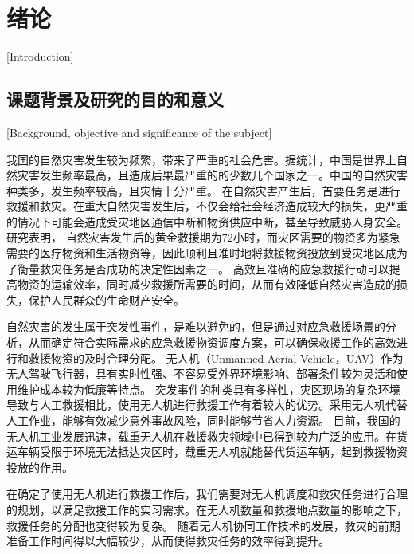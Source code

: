 
\chapter{绪论}[Introduction]

\section{课题背景及研究的目的和意义}[Background, objective and significance of the subject]

我国的自然灾害发生较为频繁，带来了严重的社会危害。据统计，中国是世界上自然灾害发生频率最高，且造成后果最严重的的少数几个国家之一\cite{ziranzaihaifangzhide}。中国的自然灾害种类多，发生频率较高，且灾情十分严重。
在自然灾害产生后，首要任务是进行救援和救灾。在重大自然灾害发生后，不仅会给社会经济造成较大的损失，更严重的情况下可能会造成受灾地区通信中断和物资供应中断，甚至导致威胁人身安全。研究表明，
自然灾害发生后的黄金救援期为72小时，而灾区需要的物资多为紧急需要的医疗物资和生活物资等，因此顺利且准时地将救援物资投放到受灾地区成为了衡量救灾任务是否成功的决定性因素之一。\cite{yuqingqing}
高效且准确的应急救援行动可以提高物资的运输效率，同时减少救援所需要的时间，从而有效降低自然灾害造成的损失，保护人民群众的生命财产安全。


自然灾害的发生属于突发性事件，是难以避免的，但是通过对应急救援场景的分析，从而确定符合实际需求的应急救援物资调度方案，可以确保救援工作的高效进行和救援物资的及时合理分配。
无人机（Unmanned Aerial Vehicle，UAV）作为无人驾驶飞行器，具有实时性强、不容易受外界环境影响、部署条件较为灵活和使用维护成本较为低廉等特点。
突发事件的种类具有多样性，灾区现场的复杂环境导致与人工救援相比，使用无人机进行救援工作有着较大的优势。采用无人机代替人工作业，能够有效减少意外事故风险，同时能够节省人力资源。
目前，我国的无人机工业发展迅速，载重无人机在救援救灾领域中已得到较为广泛的应用。在货运车辆受限于环境无法抵达灾区时，载重无人机就能替代货运车辆，起到救援物资投放的作用。\cite{liuyajing}


在确定了使用无人机进行救援工作后，我们需要对无人机调度和救灾任务进行合理的规划，以满足救援工作的实习需求。在无人机数量和救援地点数量的影响之下，救援任务的分配也变得较为复杂。
随着无人机协同工作技术的发展，救灾的前期准备工作时间得以大幅较少，从而使得救灾任务的效率得到提升。


